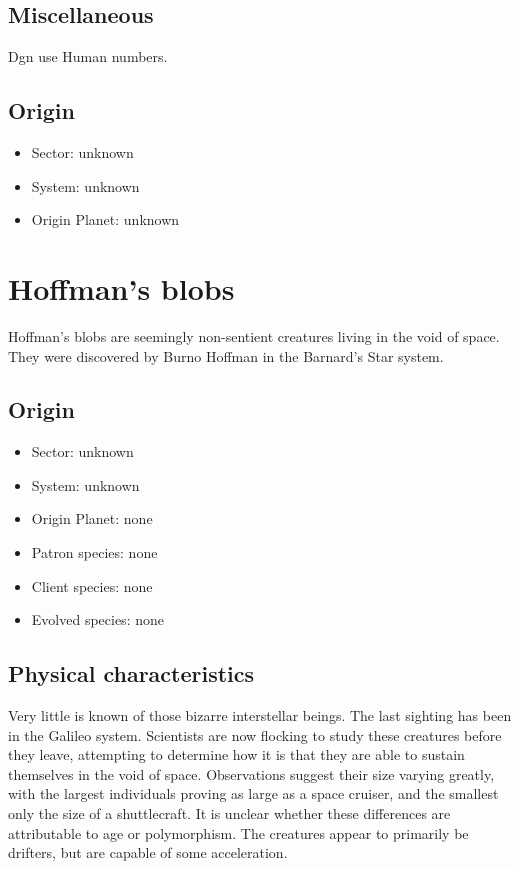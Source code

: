 \subsection{Miscellaneous}
Dgn use Human numbers. 

\subsection{Origin}
\begin{itemize}
\item Sector: unknown
\item System: unknown
\item Origin Planet: unknown 
\end{itemize}

\section{Hoffman's blobs}

Hoffman's blobs are seemingly non-sentient creatures living in the
void of space. They were discovered by Burno Hoffman in the Barnard's
Star system.

\subsection{Origin}
\begin{itemize}
\item Sector: unknown
\item System: unknown
\item Origin Planet: none
\item Patron species: none
\item Client species: none
\item Evolved species: none 
\end{itemize}

\subsection{Physical characteristics}
Very little is known of those bizarre interstellar beings. The last
sighting has been in the Galileo system. Scientists are now flocking
to study these creatures before they leave, attempting to determine
how it is that they are able to sustain themselves in the void of
space. Observations suggest their size varying greatly, with the
largest individuals proving as large as a space cruiser, and the
smallest only the size of a shuttlecraft. It is unclear whether these
differences are attributable to age or polymorphism. The creatures
appear to primarily be drifters, but are capable of some acceleration.

